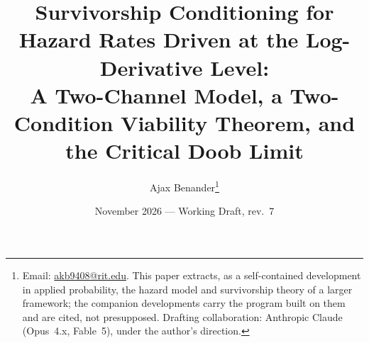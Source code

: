 \title{Survivorship Conditioning for Hazard Rates Driven at the
Log-Derivative Level:\\ \large A Two-Channel Model, a Two-Condition
Viability Theorem, and the Critical Doob Limit}
\author{Ajax Benander\thanks{Email:
\href{mailto:akb9408@rit.edu}{akb9408@rit.edu}. This paper extracts, as
a self-contained development in applied probability, the hazard model
and survivorship theory of a larger framework; the companion
developments carry the program built on them and are cited, not
presupposed. Drafting collaboration: Anthropic Claude (Opus~4.x,
Fable~5), under the author's direction.}}
\date{November 2026 --- Working Draft, rev.~7}


\maketitle

